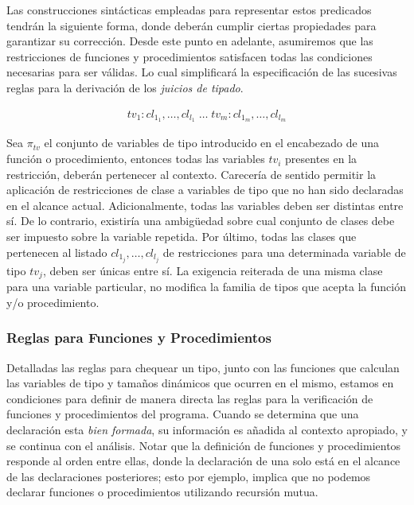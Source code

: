 Las construcciones sintácticas empleadas para representar estos predicados tendrán la siguiente forma, donde deberán cumplir ciertas propiedades para garantizar su corrección.
Desde este punto en adelante, asumiremos que las restricciones de funciones y procedimientos satisfacen todas las condiciones necesarias para ser válidas.
Lo cual simplificará la especificación de las sucesivas reglas para la derivación de los \textit{juicios de tipado}.


\begin{gather*}
tv_{1} : cl_{1_1}, \ldots, cl_{l_1} \; \ldots \; tv_{m} : cl_{1_m}, \ldots, cl_{l_m}
\end{gather*}

Sea $\pi_{tv}$ el conjunto de variables de tipo introducido en el encabezado de una función o procedimiento, entonces todas las variables $tv_{i}$ presentes en la restricción, deberán pertenecer al contexto.
Carecería de sentido permitir la aplicación de restricciones de clase a variables de tipo que no han sido declaradas en el alcance actual.
Adicionalmente, todas las variables deben ser distintas entre sí.
De lo contrario, existiría una ambigüedad sobre cual conjunto de clases debe ser impuesto sobre la variable repetida.
Por último, todas las clases que pertenecen al listado $cl_{1_j}, \ldots, cl_{l_j}$ de restricciones para una determinada variable de tipo $tv_{j}$, deben ser únicas entre sí.
La exigencia reiterada de una misma clase para una variable particular, no modifica la familia de tipos que acepta la función y/o procedimiento.

\subsubsection{Reglas para Funciones y Procedimientos}

Detalladas las reglas para chequear un tipo, junto con las funciones que calculan las variables de tipo y tamaños dinámicos que ocurren en el mismo, estamos en condiciones para definir de manera directa las reglas para la verificación de funciones y procedimientos del programa.
Cuando se determina que una declaración esta \textit{bien formada}, su información es añadida al contexto apropiado, y se continua con el análisis.
Notar que la definición de funciones y procedimientos responde al orden entre ellas, donde la declaración de una solo está en el alcance de las declaraciones posteriores; esto por ejemplo, implica que no podemos declarar funciones o procedimientos utilizando recursión mutua.

